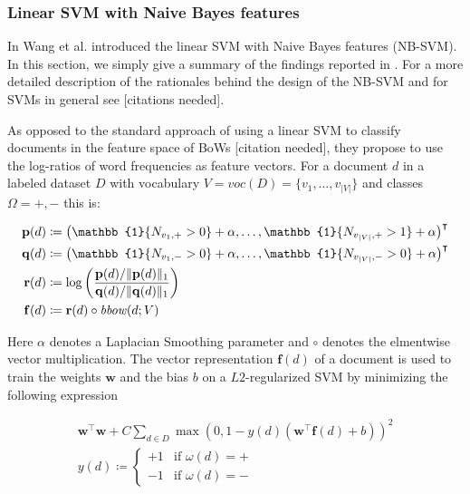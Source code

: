 \subsubsection{Linear SVM with Naive Bayes features}

In \cite{wang2012baselines} Wang et al. introduced the linear SVM with Naive
Bayes features (NB-SVM). In this section, we simply give a summary of the
findings reported in \cite{wang2012baselines}. For a more detailed description
of the rationales behind the design of the NB-SVM and for SVMs in general see
[citations needed].

As opposed to the standard approach of using a linear SVM to
classify documents in the feature space of BoWs [citation needed], they propose
to use the log-ratios of word frequencies as feature vectors. 
For a document $d$ in a labeled dataset $D$ with vocabulary $V = voc(D) = \{v_1, \ldots, v_{|V|} \}$ and classes
$\Omega = {+, -}$ this is:

\begin{equation*}
\begin{split}
\mathbf{p}(d) &\coloneqq \left(\mathbb{1}\{N_{v_1,+} > 0\} + \alpha, \ldots,
\mathbb{1}\{N_{v_{|V|},+} > 1\} + \alpha\right)^\intercal
\\
\mathbf{q}(d) &\coloneqq \left(\mathbb{1}\{N_{v_1,-} >0 \} + \alpha, \ldots,
\mathbb{1}\{N_{v_{|V|},-} > 0\} + \alpha\right)^\intercal \\
\mathbf{r}(d) &\coloneqq \log\left(\frac{\mathbf{p}(d) / \lVert
\mathbf{p}(d)\rVert_1}{\mathbf{q}(d) / \lVert \mathbf{q}(d)\rVert_1}\right) \\
\mathbf{f}(d) &\coloneqq \mathbf{r}(d) \circ \mli{bbow}(d; V)
\end{split}
\end{equation*}

Here $\alpha$ denotes a Laplacian Smoothing parameter and $\circ$ denotes the
elmentwise vector multiplication.  
The vector representation $\mathbf{f}(d)$ of a document is used to train the
weights $\mathbf{w}$ and the bias $b$ on a $L2$-regularized SVM by minimizing the following expression

\begin{equation}
\begin{split}
\mathbf{w}^\intercal\mathbf{w} + C\sum\limits_{d\in D} \max\left(0,
1-y(d)(\mathbf{w}^\intercal\mathbf{f}(d) + b)\right)^2 \\
y(d) \coloneqq \begin{cases} +1 & \text{if~} \omega(d) = + \\ -1 & \text{if~}
\omega(d) = - \end{cases}
\end{split}
\end{equation}

